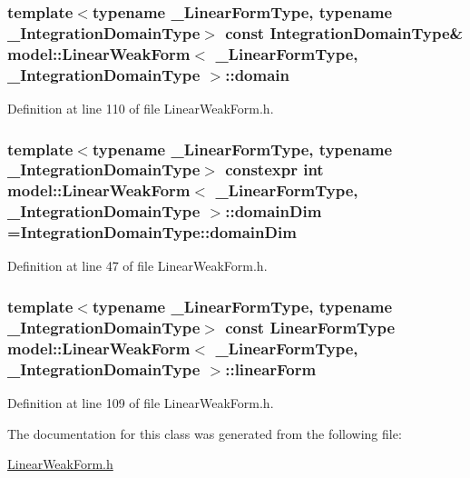 \subsubsection[{domain}]{\setlength{\rightskip}{0pt plus 5cm}template$<$typename \+\_\+\+Linear\+Form\+Type, typename \+\_\+\+Integration\+Domain\+Type$>$ const {\bf Integration\+Domain\+Type}\& {\bf model\+::\+Linear\+Weak\+Form}$<$ \+\_\+\+Linear\+Form\+Type, \+\_\+\+Integration\+Domain\+Type $>$\+::domain}\label{classmodel_1_1_linear_weak_form_af1fa854a6b2b1504a761281fbf9629c7}


Definition at line 110 of file Linear\+Weak\+Form.\+h.

\hypertarget{classmodel_1_1_linear_weak_form_a24e73a68c0db2e41067cacb7a24f6553}{}
\subsubsection[{domain\+Dim}]{\setlength{\rightskip}{0pt plus 5cm}template$<$typename \+\_\+\+Linear\+Form\+Type, typename \+\_\+\+Integration\+Domain\+Type$>$ constexpr int {\bf model\+::\+Linear\+Weak\+Form}$<$ \+\_\+\+Linear\+Form\+Type, \+\_\+\+Integration\+Domain\+Type $>$\+::domain\+Dim =Integration\+Domain\+Type\+::domain\+Dim\hspace{0.3cm}{\ttfamily [static]}}\label{classmodel_1_1_linear_weak_form_a24e73a68c0db2e41067cacb7a24f6553}


Definition at line 47 of file Linear\+Weak\+Form.\+h.

\hypertarget{classmodel_1_1_linear_weak_form_a3da50f998ad52d2fe77ebd41c60af146}{}
\subsubsection[{linear\+Form}]{\setlength{\rightskip}{0pt plus 5cm}template$<$typename \+\_\+\+Linear\+Form\+Type, typename \+\_\+\+Integration\+Domain\+Type$>$ const {\bf Linear\+Form\+Type} {\bf model\+::\+Linear\+Weak\+Form}$<$ \+\_\+\+Linear\+Form\+Type, \+\_\+\+Integration\+Domain\+Type $>$\+::linear\+Form}\label{classmodel_1_1_linear_weak_form_a3da50f998ad52d2fe77ebd41c60af146}


Definition at line 109 of file Linear\+Weak\+Form.\+h.



The documentation for this class was generated from the following file\+:\begin{DoxyCompactItemize}
\item 
\hyperlink{_linear_weak_form_8h}{Linear\+Weak\+Form.\+h}\end{DoxyCompactItemize}
